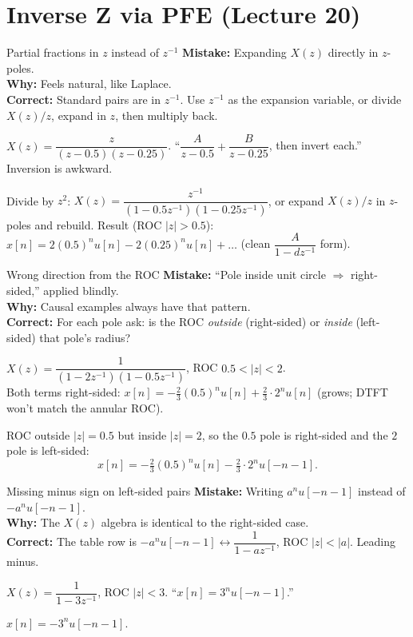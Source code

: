 \documentclass[11pt]{article}
\begin{document}
\section{Inverse Z via PFE (Lecture 20)}

\begin{pitfallbox}{Partial fractions in $z$ instead of $z^{-1}$}
\textbf{Mistake:} Expanding $X(z)$ directly in $z$-poles.\\
\textbf{Why:} Feels natural, like Laplace.\\
\textbf{Correct:} Standard pairs are in $z^{-1}$. Use $z^{-1}$ as the expansion variable, or divide $X(z)/z$, expand in $z$, then multiply back.
\begin{wrongbox}
$X(z) = \dfrac{z}{(z-0.5)(z-0.25)}$. ``$\dfrac{A}{z-0.5}+\dfrac{B}{z-0.25}$, then invert each.'' Inversion is awkward.
\end{wrongbox}
\begin{rightbox}
Divide by $z^2$: $X(z) = \dfrac{z^{-1}}{(1-0.5z^{-1})(1-0.25z^{-1})}$, or expand $X(z)/z$ in $z$-poles and rebuild. Result (ROC $|z|>0.5$): $x[n] = 2(0.5)^n u[n] - 2(0.25)^n u[n] + \ldots$ (clean $\dfrac{A}{1-dz^{-1}}$ form).
\end{rightbox}
\end{pitfallbox}

\begin{pitfallbox}{Wrong direction from the ROC}
\textbf{Mistake:} ``Pole inside unit circle $\Rightarrow$ right-sided,'' applied blindly.\\
\textbf{Why:} Causal examples always have that pattern.\\
\textbf{Correct:} For each pole ask: is the ROC \emph{outside} (right-sided) or \emph{inside} (left-sided) that pole's radius?
\begin{wrongbox}
$X(z) = \dfrac{1}{(1-2z^{-1})(1-0.5z^{-1})}$, ROC $0.5<|z|<2$.\\
Both terms right-sided: $x[n] = -\tfrac{2}{3}(0.5)^n u[n] + \tfrac{2}{3}\cdot 2^n u[n]$ (grows; DTFT won't match the annular ROC).
\end{wrongbox}
\begin{rightbox}
ROC outside $|z|=0.5$ but inside $|z|=2$, so the $0.5$ pole is right-sided and the $2$ pole is left-sided:
$$x[n] = -\tfrac{2}{3}(0.5)^n u[n] - \tfrac{2}{3}\cdot 2^n u[-n-1].$$
\end{rightbox}
\end{pitfallbox}

\begin{pitfallbox}{Missing minus sign on left-sided pairs}
\textbf{Mistake:} Writing $a^n u[-n-1]$ instead of $-a^n u[-n-1]$.\\
\textbf{Why:} The $X(z)$ algebra is identical to the right-sided case.\\
\textbf{Correct:} The table row is $-a^n u[-n-1] \leftrightarrow \dfrac{1}{1-az^{-1}}$, ROC $|z|<|a|$. Leading minus.
\begin{wrongbox}
$X(z) = \dfrac{1}{1-3z^{-1}}$, ROC $|z|<3$. ``$x[n] = 3^n u[-n-1]$.''
\end{wrongbox}
\begin{rightbox}
$x[n] = -3^n u[-n-1]$.
\end{rightbox}
\end{pitfallbox}
\end{document}
